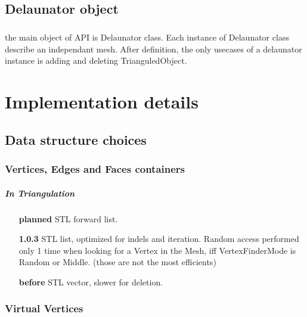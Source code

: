 \documentclass{report}
\begin{document}
\section{Delaunator object}
    \paragraph*{}
    the main object of API is Delaunator class. Each instance of Delaunator class describe an independant mesh.
    After definition, the only usecases of a delaunator instance is adding and deleting TrianguledObject.
    \paragraph*{}




\chapter{Implementation details}

\section{Data structure choices}
\subsection{Vertices, Edges and Faces containers}
    \paragraph*{In Triangulation}
    \begin{enumerate}
        \item[\textbf{planned}] STL forward list.
        \item[\textbf{1.0.3 }] STL list, optimized for indels and iteration. Random access performed only 1 time when looking for a Vertex in the Mesh, iff VertexFinderMode is Random or Middle. (those are not the most efficients)
        \item[\textbf{before}] STL vector, slower for deletion.
    \end{enumerate}

\subsection{Virtual Vertices}
    \paragraph*{}
\end{document}
